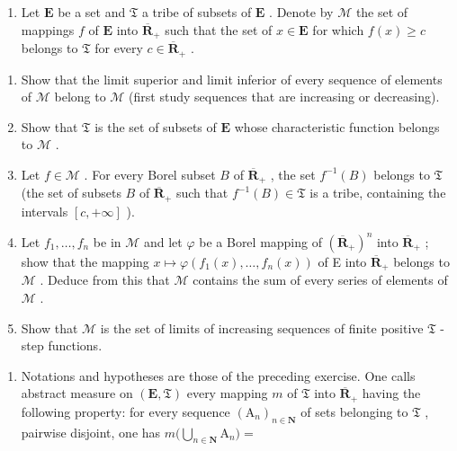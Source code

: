 \begin{enumerate}
\def\labelenumi{\arabic{enumi})}
\setcounter{enumi}{2}
\tightlist
\item
  Let \(\mathbf{E}\) be a set and \(\mathfrak{T}\) a tribe of subsets of \(\mathbf{E}\) . Denote by \(\mathcal{M}\) the set of mappings \(f\) of \(\mathbf{E}\) into \(\overline{\mathbf{R}}_+\) such that the set of \(x \in \mathbf{E}\) for which \(f(x) \geqslant c\) belongs to \(\mathfrak{T}\) for every \(c \in \overline{\mathbf{R}}_+\) .
\end{enumerate}

\begin{enumerate}
\def\labelenumi{\alph{enumi})}
\item
  Show that the limit superior and limit inferior of every sequence of elements of \(\mathcal{M}\) belong to \(\mathcal{M}\) (first study sequences that are increasing or decreasing).
\item
  Show that \(\mathfrak{T}\) is the set of subsets of \(\mathbf{E}\) whose characteristic function belongs to \(\mathcal{M}\) .
\item
  Let \(f \in \mathcal{M}\) . For every Borel subset \(B\) of \(\overline{\mathbf{R}}_+\) , the set \(f^{-1}(B)\) belongs to \(\mathfrak{T}\) (the set of subsets \(B\) of \(\overline{\mathbf{R}}_+\) such that \(f^{-1}(B) \in \mathfrak{T}\) is a tribe, containing the intervals \([c, +\infty]\) ).
\item
  Let \(f_1, \ldots, f_n\) be in \(\mathcal{M}\) and let \(\varphi\) be a Borel mapping of \((\overline{\mathbf{R}}_+)^n\) into \(\overline{\mathbf{R}}_+\) ; show that the mapping \(x \mapsto \varphi(f_1(x), \ldots, f_n(x))\) of E into \(\overline{\mathbf{R}}_+\) belongs to \(\mathcal{M}\) . Deduce from this that \(\mathcal{M}\) contains the sum of every series of elements of \(\mathcal{M}\) .
\item
  Show that \(\mathcal{M}\) is the set of limits of increasing sequences of finite positive \(\mathfrak{T}\) -step functions.
\end{enumerate}

\begin{enumerate}
\def\labelenumi{\arabic{enumi})}
\setcounter{enumi}{3}
\tightlist
\item
  Notations and hypotheses are those of the preceding exercise. One calls abstract measure on \((\mathbf{E},\mathfrak{T})\) every mapping \(m\) of \(\mathfrak{T}\) into \(\overline{\mathbf{R}}_+\) having the following property: for every sequence \((\mathrm{A}_n)_{n\in \mathbf{N}}\) of sets belonging to \(\mathfrak{T}\) , pairwise disjoint, one has \(m\big(\bigcup_{n\in \mathbf{N}}\mathrm{A}_n\big) =\)
\end{enumerate}

